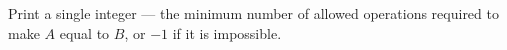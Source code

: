 Print a single integer --- the minimum number of allowed operations required to make $A$ equal to $B$, or $-1$ if it is impossible.